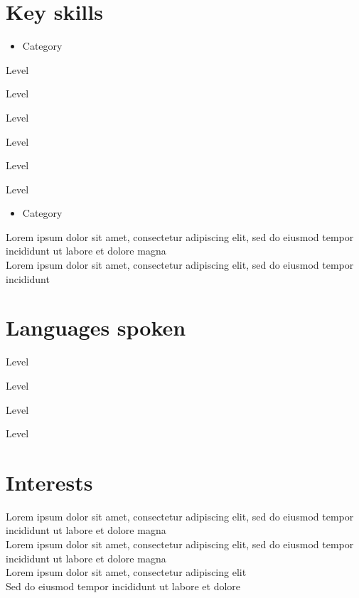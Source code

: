 \documentclass[12pt]{article}
\begin{document}
\begin{minipage}[t]{0.29\textwidth}
\section*{Key skills}
\vspace*{-0.1cm}
\begin{itemize}
    \item Category
\end{itemize}
\vspace*{-0.7cm}
\begin{description}[leftmargin=!,labelwidth=2.5cm]
     \item[Skill]       Level
     \item[Skill]       Level
     \item[Skill]       Level
     \item[Skill]       Level
     \item[Skill]       Level
     \item[Skill]       Level
\end{description}
\vspace*{-0.7cm}
\begin{itemize}
    \item Category
\end{itemize}
\vspace*{-0.2cm}
Lorem ipsum dolor sit amet, consectetur adipiscing elit, sed do eiusmod tempor incididunt ut labore et dolore magna\medskip\\Lorem ipsum dolor sit amet, consectetur adipiscing elit, sed do eiusmod tempor incididunt
\vspace*{-0.5cm}
%
%
\section*{Languages spoken}
\begin{description}[leftmargin=!,labelwidth=2.5cm]
  \item[Language]   Level
  \item[Language]   Level
  \item[Language]   Level
  \item[Language]   Level
\end{description}
\vspace*{-0.8cm}
%
%
\section*{Interests}
Lorem ipsum dolor sit amet, consectetur adipiscing elit, sed do eiusmod tempor incididunt ut labore et dolore magna\medskip\\Lorem ipsum dolor sit amet, consectetur adipiscing elit, sed do eiusmod tempor incididunt ut labore et dolore magna\medskip\\Lorem ipsum dolor sit amet, consectetur adipiscing elit\medskip\\Sed do eiusmod tempor incididunt ut labore et dolore
\end{minipage}
\end{document}
